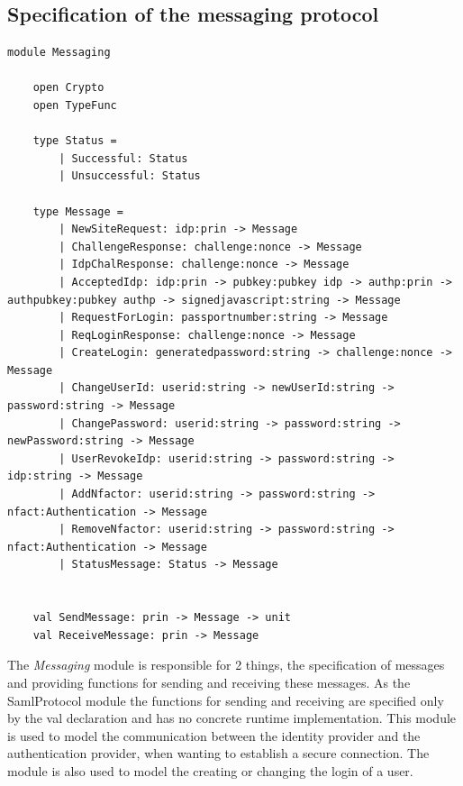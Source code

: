 \documentclass[twosided]{report}
\begin{document}
\subsection{Specification of the messaging protocol}
\begin{lstlisting}[style=fstar, caption={Specification of the Messaging protocol}]
	module Messaging
	
	open Crypto
	open TypeFunc

	type Status =
		| Successful: Status
		| Unsuccessful: Status

	type Message =
		| NewSiteRequest: idp:prin -> Message
		| ChallengeResponse: challenge:nonce -> Message
		| IdpChalResponse: challenge:nonce -> Message
		| AcceptedIdp: idp:prin -> pubkey:pubkey idp -> authp:prin -> authpubkey:pubkey authp -> signedjavascript:string -> Message
		| RequestForLogin: passportnumber:string -> Message
		| ReqLoginResponse: challenge:nonce -> Message
		| CreateLogin: generatedpassword:string -> challenge:nonce -> Message
		| ChangeUserId: userid:string -> newUserId:string -> password:string -> Message
		| ChangePassword: userid:string -> password:string -> newPassword:string -> Message
		| UserRevokeIdp: userid:string -> password:string -> idp:string -> Message
		| AddNfactor: userid:string -> password:string -> nfact:Authentication -> Message
		| RemoveNfactor: userid:string -> password:string -> nfact:Authentication -> Message
		| StatusMessage: Status -> Message


	val SendMessage: prin -> Message -> unit
	val ReceiveMessage: prin -> Message
\end{lstlisting}

The \emph{Messaging} module is responsible for 2 things, the specification of messages and providing functions for sending and receiving these messages. As the SamlProtocol module the functions for sending and receiving are specified only by the val declaration and has no concrete runtime implementation. This module is used to model the communication between the identity provider and the authentication provider, when wanting to establish a secure connection. The module is also used to model the creating or changing the login of a user.

\clearpage
\end{document}

